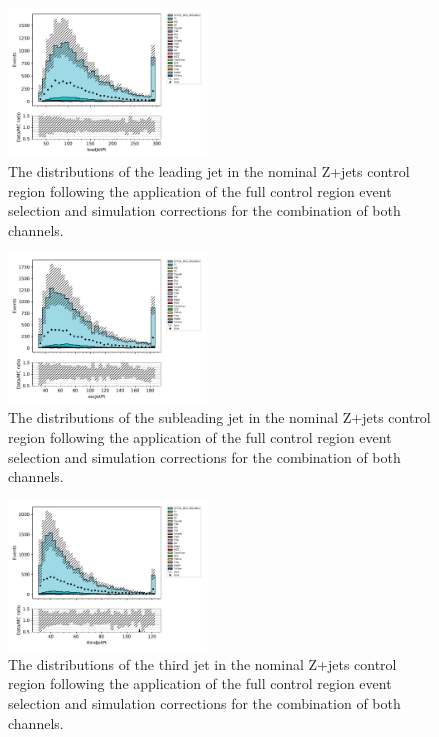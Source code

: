 \begin{figure}[tbp]
\centering
\includegraphics[width=0.47\textwidth]{figs/tzq-fullSelection-plots/plots_ee_zPlus/leadJetPt.pdf}
\caption{
The distributions of the leading jet \pt in the nominal Z+jets control region following the application of the full control region event selection and simulation corrections for the combination of both channels.
}
\label{fig:zPlusCR_leadJetPt}
\end{figure}

\begin{figure}[tbp]
\centering
\includegraphics[width=0.47\textwidth]{figs/tzq-fullSelection-plots/plots_ee_zPlus/secJetPt.pdf}
\caption{
The distributions of the subleading jet \pt in the nominal Z+jets control region following the application of the full control region event selection and simulation corrections for the combination of both channels.
}
\label{fig:zPlusCR_secJetPt}
\end{figure}

\begin{figure}[tbp]
\centering
\includegraphics[width=0.47\textwidth]{figs/tzq-fullSelection-plots/plots_ee_zPlus/thirdJetPt.pdf}
\caption{
The distributions of the third jet \pt in the nominal Z+jets control region following the application of the full control region event selection and simulation corrections for the combination of both channels.
}
\label{fig:zPlusCR_thirdJetPt}
\end{figure}

